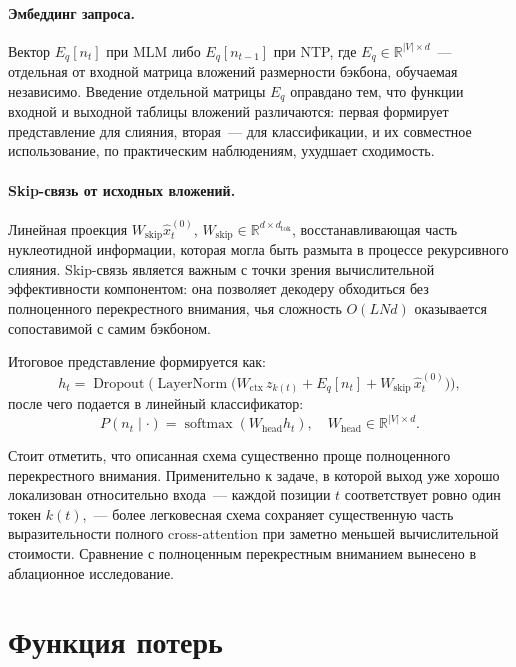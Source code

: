\paragraph{Эмбеддинг запроса.} Вектор $E_q[n_t]$ при MLM либо
$E_q[n_{t-1}]$ при NTP, где $E_q \in \mathbb{R}^{|V| \times d}$~---
отдельная от входной матрица вложений размерности бэкбона, обучаемая
независимо. Введение отдельной матрицы $E_q$ оправдано тем, что
функции входной и выходной таблицы вложений различаются: первая
формирует представление для слияния, вторая~--- для классификации, и
их совместное использование, по практическим наблюдениям, ухудшает
сходимость.

\paragraph{Skip-связь от исходных вложений.} Линейная проекция
$W_{\text{skip}} \hat x_t^{(0)}$, $W_{\text{skip}} \in \mathbb{R}^{d
\times d_{\text{tok}}}$, восстанавливающая часть нуклеотидной
информации, которая могла быть размыта в процессе рекурсивного
слияния. Skip-связь является важным с точки зрения вычислительной
эффективности компонентом: она позволяет декодеру обходиться без
полноценного перекрестного внимания, чья сложность $O(L N d)$
оказывается сопоставимой с самим бэкбоном.

Итоговое представление формируется как:
\begin{equation}
  h_t = \operatorname{Dropout}\!\Big(\operatorname{LayerNorm}\!\big(W_{\text{ctx}}\, z_{k(t)} + E_q[n_t] + W_{\text{skip}}\, \hat x_t^{(0)}\big)\Big),
  \label{eq:decoder}
\end{equation}
после чего подается в линейный классификатор:
\begin{equation}
  P(n_t \mid \cdot) = \operatorname{softmax}(W_{\text{head}} h_t),
  \quad W_{\text{head}} \in \mathbb{R}^{|V| \times d}.
\end{equation}

Стоит отметить, что описанная схема существенно проще полноценного
перекрестного внимания. Применительно к задаче, в которой выход уже
хорошо локализован относительно входа~--- каждой позиции $t$
соответствует ровно один токен $k(t)$,~--- более легковесная схема
сохраняет существенную часть выразительности полного cross-attention при
заметно меньшей вычислительной стоимости. Сравнение с полноценным
перекрестным вниманием вынесено в аблационное исследование.

\section{Функция потерь}

